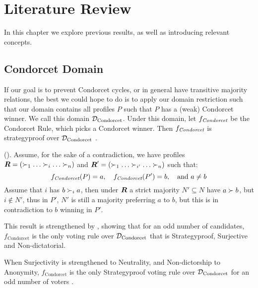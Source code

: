 \newpage
\chapter{Literature Review}
\label{Literature}


In this chapter we explore previous results, as well as introducing relevant concepts.




\section{Condorcet Domain}
If our goal is to prevent Condorcet cycles, or in general have transitive majority relations, the best we could hope to do is to apply our domain restriction such that our domain contains all profiles $P$ such that $P$ has a (weak) Condorcet winner. We call this domain $\mathcal{D}_{\textnormal{Condorcet}}$. Under this domain, let $f_{\textit{Condorcet}}$ be the Condorcet Rule, which picks a Condorcet winner. Then $f_{\textit{Condorcet}}$ is strategyproof over $\mathcal{D}_{\textnormal{Condorcet}}$ \citep{elkindPreferenceRestrictionsComputational2022}.

\begin{proofc}{(\citet{elkindPreferenceRestrictionsComputational2022})}.
	Assume, for the sake of a contradiction, we have profiles $\strictProfile = (\pref_1 \dots \pref_i \dots \pref_n)$ and $\strictProfile' = (\pref_1 \dots \pref_{i'} \dots \pref_n)$ such that:
	\[
		f_{\textit{Condorcet}}(P) = a, \quad f_{\textit{Condorcet}}(P') = b, \quad \text{and } a \neq b
	\]
	Assume that $i$ has $b \succ_i a$, then under $\boldsymbol{R}$ a strict majority $N' \subseteq N$ have $a \succ b$, but $i \notin N'$, thus in $P'$, $N'$ is still a majority preferring $a$ to $b$, but this is in contradiction to $b$ winning in $P'$.
\end{proofc}

This result is strengthened by \citet{campbellNonmonotonicityDoesNot2002,campbellCorrectionStrategyproofnessCharacterization2016}, showing that for an odd number of candidates, \(f_{\text{Condorcet}}\) is the only voting rule over \(\mathcal{D}_{\textnormal{Condorcet}}\) that is Strategyproof, Surjective and Non-dictatorial.

When Surjectivity is strengthened to Neutrality, and Non-dictorship to Anonymity, \linebreak \(f_{\text{Condorcet}}\) is the only Strategyproof voting rule over \(\mathcal{D}_{\textnormal{Condorcet}}\) for an odd number of voters \cite{campbellAnonymousNeutralStrategyproof2015}.

